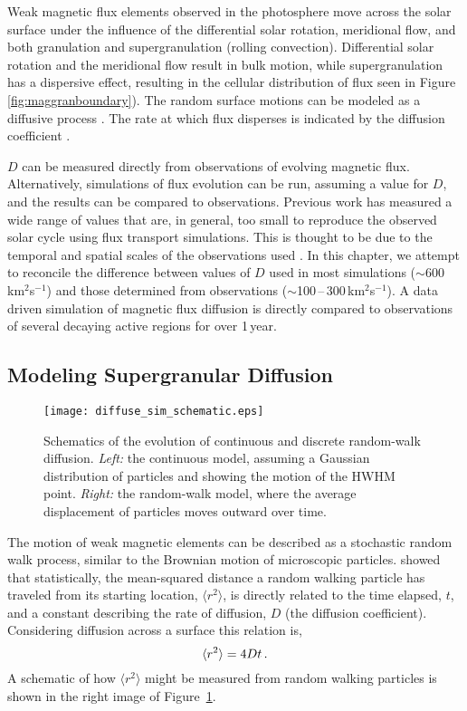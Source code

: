 Weak magnetic flux elements observed in the photosphere move across the solar surface under the influence of the differential solar rotation, meridional flow, and both granulation and supergranulation (rolling convection). Differential solar rotation and the meridional flow result in bulk motion, while supergranulation has a dispersive effect, resulting in the cellular distribution of flux seen in Figure\,\ref{fig:maggranboundary}). The random surface motions can be modeled as a diffusive process \citep{Sheeley:2005}. The rate at which flux disperses is indicated by the diffusion coefficient \citep[$D$][]{Einstein:1905}. 

$D$ can be measured directly from observations of evolving magnetic flux. Alternatively, simulations of flux evolution can be run, assuming a value for $D$, and the results can be compared to observations. Previous work has measured a wide range of values that are, in general, too small to reproduce the observed solar cycle using flux transport simulations. This is thought to be due to the temporal and spatial scales of the observations used \citep{Schrijver:1996}. In this chapter, we attempt to reconcile the difference between values of $D$ used in most simulations ($\sim$600\,km$^2$s$^{-1}$) and those determined from observations ($\sim$100\,--\,300\,km$^2$s$^{-1}$). A data driven simulation of magnetic flux diffusion is directly compared to observations of several decaying active regions for over 1\,year.

\subsection{Modeling Supergranular Diffusion}

 \begin{figure}[!t]    %
   \centerline{\texttt{[image: diffuse\_sim\_schematic.eps]}
              }
              \caption[Schematics of the evolution of continuous and discrete random-walk diffusion.]{Schematics of the evolution of continuous and discrete random-walk diffusion. \emph{Left:} the continuous model, assuming a Gaussian distribution of particles and showing the motion of the HWHM point. \emph{Right:} the random-walk model, where the average displacement of particles moves outward over time.}
   \label{fig:diffschematic}
   \end{figure}

The motion of weak magnetic elements can be described as a stochastic random walk process, similar to the Brownian motion of microscopic particles. \cite{Einstein:1905} showed that statistically, the mean-squared distance a random walking particle has traveled from its starting location, $\langle r^2 \rangle$, is directly related to the time elapsed, $t$, and a constant describing the rate of diffusion, $D$ (the diffusion coefficient). Considering diffusion across a surface this relation is,
\begin{equation}\label{eqn:einstein}
\langle r^2 \rangle=4Dt \mbox{\,.}
\end{equation}
A schematic of how $\langle r^2 \rangle$ might be measured from random walking particles is shown in the right image of Figure~\ref{fig:diffschematic}.


